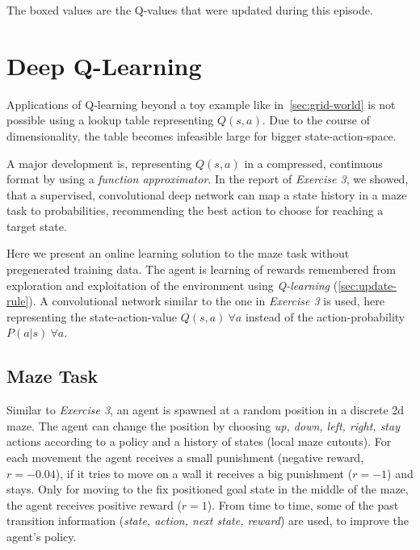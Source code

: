 \documentclass[a4paper,14pt]{article}
\begin{document}
The boxed values are the Q-values that were updated during this episode.
\section{Deep Q-Learning}\label{sec:deep-q-learning}

Applications of Q-learning beyond a toy example like
in~\autoref{sec:grid-world} is not possible using a lookup table representing
$Q(s, a)$.
Due to the course of dimensionality, the table becomes infeasible large for
bigger state-action-space.

A major development is, representing $Q(s, a)$ in a compressed, continuous
format by using a \textit{function approximator}.
In the report of \textit{Exercise 3}, we showed, that a supervised, convolutional
deep network can map a state history in a maze task to probabilities, recommending
the best action to choose for reaching a target state.

Here we present an online learning solution to the maze task without
pregenerated training data.
The agent is learning of rewards remembered from exploration and exploitation of the environment using
\textit{Q-learning} (\autoref{sec:update-rule}).
A convolutional network similar to the one in \textit{Exercise 3} is used, here
representing the state-action-value $Q(s, a)~\forall a$
 instead of the action-probability $P(a|s)~\forall a$.

\subsection{Maze Task}

Similar to \textit{Exercise 3}, an agent is spawned at a random position in a
discrete 2d maze. The agent can change the position by choosing \textit{up, down, left, right, stay}
actions according to a policy and a history of states (local maze cutouts).
For each movement the agent receives a small punishment (negative reward, $r=-0.04$), if it tries to move on
a wall it receives a big punishment ($r=-1$) and stays.
Only for moving to the fix positioned goal state in the middle of the maze, the
agent receives positive reward ($r=1$).
From time to time, some of the past transition information (\textit{state,
  action, next state, reward}) are used, to improve the agent's policy.
\end{document}
